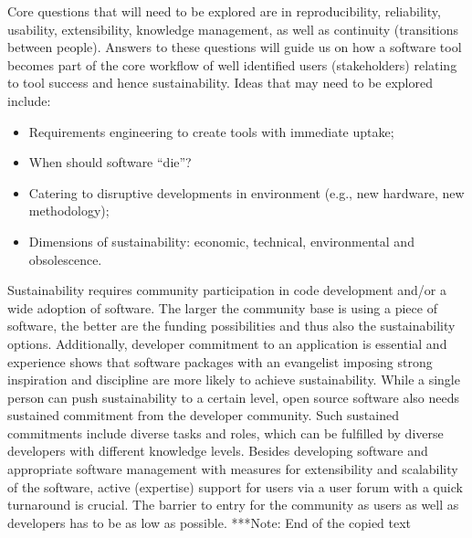 \documentclass[11pt, oneside]{amsart}
\newcommand{\note}[1]{ {\textcolor{blueish}    { ***Note:      #1 }}}
\begin{document}
Core questions that will need to be explored are in reproducibility, 
reliability,  usability, extensibility, knowledge management, as well as continuity
(transitions between people). Answers to these questions will guide us on how a software
tool becomes part of the core workflow of well identified users (stakeholders)
relating to tool success and hence sustainability.
Ideas  that may need to be explored include:
\begin{itemize}
\item Requirements engineering to create tools with immediate uptake;
\item When should software ``die''?
\item Catering to disruptive developments in environment (e.g., new hardware,
new methodology);
\item Dimensions of sustainability: economic, technical, environmental and
obsolescence. 
\end{itemize}

Sustainability requires community participation in code development and/or a
wide adoption of software. The larger the community base is using a piece of
software, the better are the funding possibilities and thus also the
sustainability options. Additionally, developer commitment to an application is
essential and experience shows that software packages with an evangelist
imposing strong inspiration and discipline are more likely to achieve
sustainability. While a single person can push sustainability to a certain
level, open source software also needs sustained commitment from the developer
community. Such sustained commitments include diverse tasks and roles, which can
be fulfilled by diverse developers with different knowledge levels. Besides
developing software and appropriate software management with measures for
extensibility and scalability of the software, active (expertise) support for
users via a user forum with a quick turnaround is crucial. The barrier to entry
for the community as users as well as developers has to be as low as possible.
\note{End of the copied text}
\end{document}
